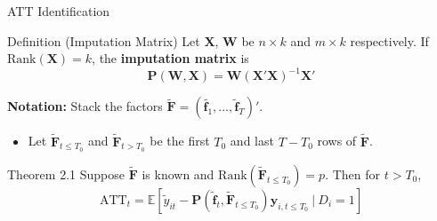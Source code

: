 \documentclass{beamer}
\newcommand{\1}{\mathds{1}} %
\newcommand{\condexpec}[2]{\mathbb{E}\left[#1 \ \vert \ #2\right]}
\begin{document}
\begin{frame}{ATT Identification}
\label{Theorem 2.1 proof back}
    \begin{block}{Definition (Imputation Matrix)}
        Let $\bm X$, $\bm W$ be $n \times k$ and $m \times k$ respectively. If $\text{Rank}(\bm X) = k$, the \textbf{imputation matrix} is 
        \begin{equation}
            \bm P(\bm W, \bm X) = \bm W (\bm X' \bm X)^{-1} \bm X'
        \end{equation}
    \end{block}

    \vspace{.5 cm}

    \textbf{Notation:} Stack the factors $\tilde{\bm F} = (\tilde{\bm f_1},...,\tilde{\bm f}_T)'$.
    \begin{itemize}
        \item Let $\tilde{\bm F}_{t \leq T_0}$ and $\tilde{\bm F}_{t > T_0}$ be the first $T_0$ and last $T - T_0$ rows of $\tilde{\bm F}$.
    \end{itemize}

    \vspace{.5 cm}

    \begin{block}{Theorem 2.1}
        Suppose $\tilde{\bm F}$ is known and $\text{Rank}(\tilde{\bm F}_{t \leq T_0}) = p$. Then for $t > T_0$,
        \begin{equation}
            \text{ATT}_t = \condexpec{\tilde{y}_{it} - \bm P(\tilde{\bm f}_t, \tilde{\bm F}_{t \leq T_0}) \bm y_{i, t \leq T_0} }{D_i = 1}
        \end{equation}
    \end{block}

    \hyperlink{Theorem 2.1 proof}{}
        
    
\end{frame}

\end{document}
